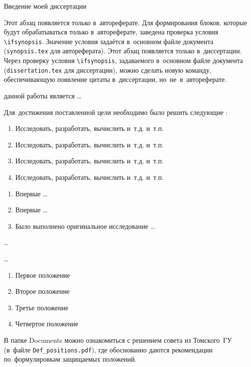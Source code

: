 {\actuality} Введение моей диссертации

\ifsynopsis
Этот абзац появляется только в~автореферате.
Для формирования блоков, которые будут обрабатываться только в~автореферате,
заведена проверка условия \verb!\!\verb!ifsynopsis!.
Значение условия задаётся в~основном файле документа (\verb!synopsis.tex! для
автореферата).
\else
Этот абзац появляется только в~диссертации.
Через проверку условия \verb!\!\verb!ifsynopsis!, задаваемого в~основном файле
документа (\verb!dissertation.tex! для диссертации), можно сделать новую
команду, обеспечивающую появление цитаты в~диссертации, но~не~в~автореферате.
\fi


{\aim} данной работы является \ldots

Для~достижения поставленной цели необходимо было решить следующие {\tasks}:
\begin{enumerate}[beginpenalty=10000] %
  \item Исследовать, разработать, вычислить и~т.\:д. и~т.\:п.
  \item Исследовать, разработать, вычислить и~т.\:д. и~т.\:п.
  \item Исследовать, разработать, вычислить и~т.\:д. и~т.\:п.
  \item Исследовать, разработать, вычислить и~т.\:д. и~т.\:п.
\end{enumerate}


{\novelty}
\begin{enumerate}[beginpenalty=10000] %
  \item Впервые \ldots
  \item Впервые \ldots
  \item Было выполнено оригинальное исследование \ldots
\end{enumerate}

{\influence} \ldots

{\methods} \ldots

{}
\begin{enumerate}[beginpenalty=10000] %
  \item Первое положение
  \item Второе положение
  \item Третье положение
  \item Четвертое положение
\end{enumerate}
В папке Documents можно ознакомиться с решением совета из Томского~ГУ
(в~файле \verb+Def_positions.pdf+), где обоснованно даются рекомендации
по~формулировкам защищаемых положений.

